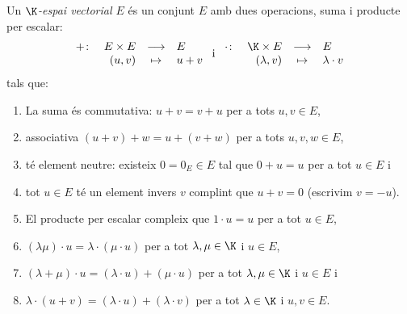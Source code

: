 \begin{definicio}
    Un \emph{$\K$-espai vectorial $E$} és un conjunt $E$ amb dues operacions, suma i producte per escalar:
    $$
    \begin{array}{rrcl}
    +\colon & E\times E & \longrightarrow & E \\
    & (u,v) & \mapsto & u+v 
    \end{array}
    \text{ i }
    \begin{array}{rrcl}
    \cdot\colon & \K\times E & \longrightarrow & E \\
    & (\lambda,v) & \mapsto & \lambda \cdot v 
    \end{array}
    $$
    tals que:
    \begin{enumerate}
        \item La suma és commutativa: $u+v=v+u$ per a tots $u,v\in E$,
        \item associativa $(u+v)+w=u+(v+w)$ per a tots $u,v,w \in E$,
        \item té element neutre: existeix $0=0_E\in E$ tal que $0+u=u$ per a tot $u\in E$ i
        \item tot $u\in E$ té un element invers $v$ complint que $u+v=0$ (escrivim $v=-u$).
        \item El producte per escalar compleix que $1\cdot u=u$ per a tot $u\in E$,
        \item $(\lambda \mu)\cdot u=\lambda \cdot(\mu\cdot u)$ per a tot $\lambda, \mu \in \K$ i $u\in E$,
        \item $(\lambda + \mu)\cdot u=(\lambda \cdot u) + (\mu\cdot u)$ per a tot $\lambda, \mu \in \K$ i $u\in E$ i 
        \item $\lambda\cdot (u+v)=(\lambda \cdot u) + (\lambda\cdot v)$ per a tot $\lambda \in \K$ i $u,v\in E$.
    \end{enumerate}
\end{definicio}
